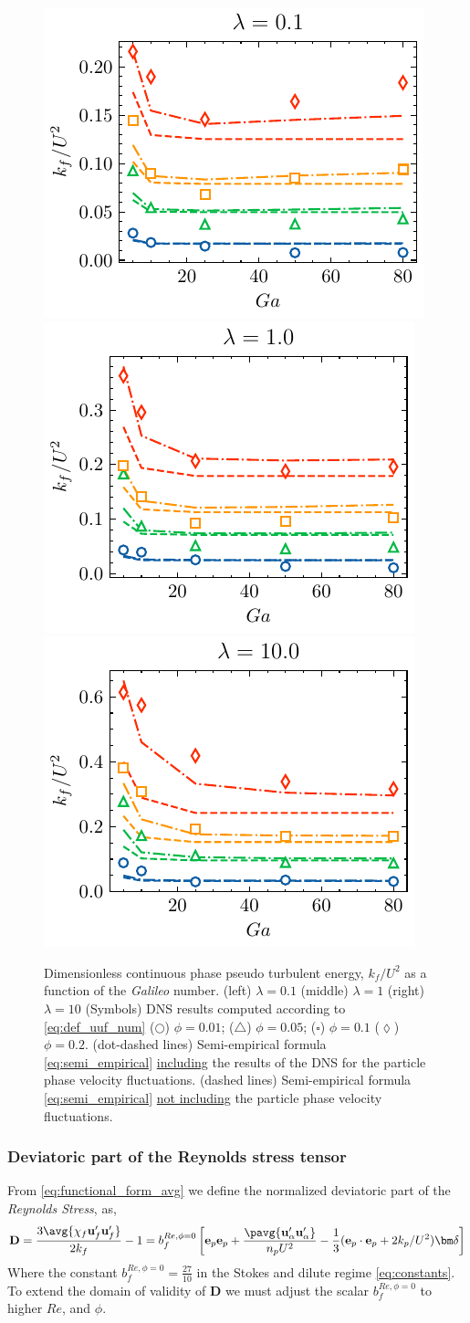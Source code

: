 \begin{figure}
    \centering
    \includegraphics[height = 0.25\textwidth]{image/HOMOGENEOUS_final/CA/KF2_l_0.pdf}
    \includegraphics[height = 0.25\textwidth]{image/HOMOGENEOUS_final/CA/KF2_l_1.pdf}
    \includegraphics[height = 0.25\textwidth]{image/HOMOGENEOUS_final/CA/KF2_l_10.pdf}
    \caption{Dimensionless continuous phase pseudo turbulent energy, $k_f/U^2$ as a function of the \textit{Galileo} number.
    (left) $\lambda = 0.1$
    (middle) $\lambda = 1$
    (right) $\lambda = 10$
    (Symbols) DNS results computed according to \ref{eq:def_uuf_num}
    ($\pmb\bigcirc$) $\phi = 0.01$; ($\pmb\triangle$) $ \phi = 0.05$; ($\pmb\square$) $\phi = 0.1$ ($\pmb\lozenge$) $\phi = 0.2$.
    (dot-dashed lines) Semi-empirical formula \ref{eq:semi_empirical} \underline{including} the results of the DNS for the particle phase velocity fluctuations. 
    (dashed lines) Semi-empirical formula \ref{eq:semi_empirical} \underline{not including} the particle phase velocity fluctuations. 
    }
    \label{fig:kf}
\end{figure}


\subsubsection{Deviatoric part of the Reynolds stress tensor}


From \ref{eq:functional_form_avg} we define the normalized deviatoric part of the \textit{Reynolds Stress}, as, 
\begin{equation}
    \textbf{D} =
    \frac{3\avg{\chi_f\textbf{u}_f'\textbf{u}_f'}}{2 k_f} - 1
    = 
    b_f^{Re,\phi = 0} \left[
        \textbf{e}_p\textbf{e}_p
        + \frac{\pavg{\textbf{u}_\alpha'\textbf{u}_\alpha'}}{n_p U^2}
         - \frac{1}{3}(\textbf{e}_p\cdot \textbf{e}_p+2k_p/U^2)\bm\delta
    \right]
    \label{eq:D_def}
\end{equation}
Where the constant $b_f^{Re,\phi =0} = \frac{27}{10}$ in the Stokes and dilute regime \eqref{eq:constants}. 
To extend the domain of validity of \textbf{D} we must adjust the scalar $b_f^{Re,\phi = 0}$ to higher $Re$, and $\phi$.  


